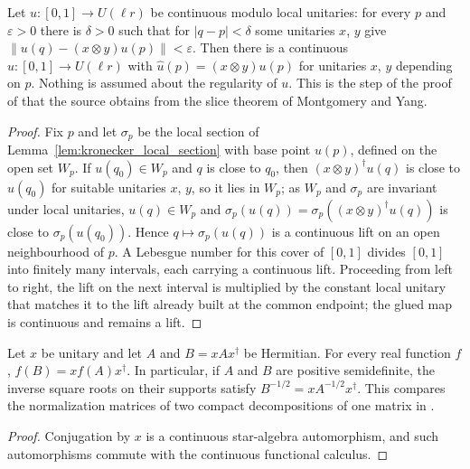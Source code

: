 \begin{lemma}
    \label{lem:kronecker_path_lifting}
    \leanok
    Let $u:[0,1]\to U(\ell r)$ be continuous modulo local unitaries: for every
    $p$ and $\varepsilon>0$ there is $\delta>0$ such that for $|q-p|<\delta$
    some unitaries $x$, $y$ give $\|u(q)-(x\otimes y)u(p)\|<\varepsilon$. Then
    there is a continuous $\hat u:[0,1]\to U(\ell r)$ with
    $\hat u(p)=(x\otimes y)u(p)$ for unitaries $x$, $y$ depending on $p$.
    Nothing is assumed about the regularity of $u$. This is the step of the
    proof of \cite[Corollary~IV.7]{Cirac2017MPU} that the source obtains from
    the slice theorem of Montgomery and Yang.
\end{lemma}

\begin{proof}\leanok
    Fix $p$ and let $\sigma_p$ be the local section of
    Lemma~\ref{lem:kronecker_local_section} with base point $u(p)$, defined on
    the open set $W_p$. If $u(q_0)\in W_p$ and $q$ is close to $q_0$, then
    $(x\otimes y)^\dagger u(q)$ is close to $u(q_0)$ for suitable unitaries
    $x$, $y$, so it lies in $W_p$; as $W_p$ and $\sigma_p$ are invariant under
    local unitaries, $u(q)\in W_p$ and
    $\sigma_p(u(q))=\sigma_p((x\otimes y)^\dagger u(q))$ is close to
    $\sigma_p(u(q_0))$. Hence $q\mapsto\sigma_p(u(q))$ is a continuous lift on
    an open neighbourhood of $p$. A Lebesgue number for this cover of $[0,1]$
    divides $[0,1]$ into finitely many intervals, each carrying a continuous
    lift. Proceeding from left to right, the lift on the next interval is
    multiplied by the constant local unitary that matches it to the lift
    already built at the common endpoint; the glued map is continuous and
    remains a lift.
\end{proof}

\begin{lemma}
    \label{lem:cfc_unitary_conjugation}
    \leanok
    Let $x$ be unitary and let $A$ and $B=xAx^\dagger$ be Hermitian. For every
    real function $f$, $f(B)=xf(A)x^\dagger$. In particular, if $A$ and $B$ are
    positive semidefinite, the inverse square roots on their supports satisfy
    $B^{-1/2}=xA^{-1/2}x^\dagger$. This compares the normalization matrices of
    two compact decompositions of one matrix in
    \cite[lines~479--502]{Cirac2017MPU}.
\end{lemma}

\begin{proof}\leanok
    Conjugation by $x$ is a continuous star-algebra automorphism, and such
    automorphisms commute with the continuous functional calculus.
\end{proof}
